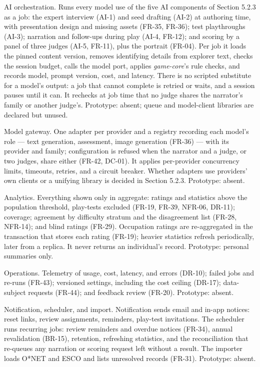 AI orchestration. Runs every model use of the five AI components of Section 5.2.3 as a job: the expert interview (AI-1) and seed drafting (AI-2) at authoring time, with presentation design and missing assets (FR-35, FR-36); test playthroughs (AI-3); narration and follow-ups during play (AI-4, FR-12); and scoring by a panel of three judges (AI-5, FR-11), plus the portrait (FR-04). Per job it loads the pinned content version, removes identifying details from explorer text, checks the session budget, calls the model port, applies \textit{game-core}'s rule checks, and records model, prompt version, cost, and latency. There is no scripted substitute for a model's output: a job that cannot complete is retried or waits, and a session pauses until it can. It rechecks at job time that no judge shares the narrator's family or another judge's. Prototype: absent; queue and model-client libraries are declared but unused.

Model gateway. One adapter per provider and a registry recording each model's role --- text generation, assessment, image generation (FR-36) --- with its provider and family; configuration is refused when the narrator and a judge, or two judges, share either (FR-42, DC-01). It applies per-provider concurrency limits, timeouts, retries, and a circuit breaker. Whether adapters use providers' own clients or a unifying library is decided in Section 5.2.3. Prototype: absent.

Analytics. Everything shown only in aggregate: ratings and statistics above the population threshold, play-tests excluded (FR-19, FR-39, NFR-06, DR-11); coverage; agreement by difficulty stratum and the disagreement list (FR-28, NFR-14); and blind ratings (FR-29). Occupation ratings are re-aggregated in the transaction that stores each rating (FR-19); heavier statistics refresh periodically, later from a replica. It never returns an individual's record. Prototype: personal summaries only.

Operations. Telemetry of usage, cost, latency, and errors (DR-10); failed jobs and re-runs (FR-43); versioned settings, including the cost ceiling (DR-17); data-subject requests (FR-44); and feedback review (FR-20). Prototype: absent.

Notification, scheduler, and import. Notification sends email and in-app notices: reset links, review assignments, reminders, play-test invitations. The scheduler runs recurring jobs: review reminders and overdue notices (FR-34), annual revalidation (BR-15), retention, refreshing statistics, and the reconciliation that re-queues any narration or scoring request left without a result. The importer loads O*NET and ESCO and lists unresolved records (FR-31). Prototype: absent.

